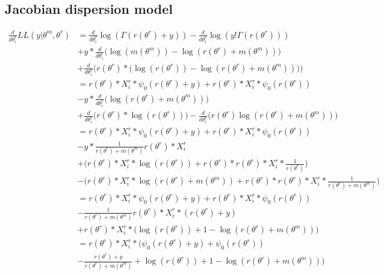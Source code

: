 \documentclass[bibliography=totoc,10pt]{scrartcl}
\begin{document}
\subsection{Jacobian dispersion model}
\begin{equation}
\begin{split}
\frac{d}{d \theta^r_i} LL(y|\theta^m, \theta^r) &= \frac{d}{d \theta^r_i} \log(\Gamma(r(\theta^r)+y)) - \frac{d}{d \theta^r_i} \log(y! \Gamma(r(\theta^r))) \\
&+ y * \frac{d}{d \theta^r_i} \bigg( \log(m(\theta^m)) -\log(r(\theta^r)+m(\theta^m)) \bigg) \\
&+ \frac{d}{d \theta^r_i} \bigg( r(\theta^r) * \bigg( \log(r(\theta^r)) - \log(r(\theta^r)+m(\theta^m)) \bigg) \bigg) \\
&= r(\theta^r) * X^r_{i} * \psi_0(r(\theta^r)+y)+ r(\theta^r) * X^r_{i} * \psi_0(r(\theta^r)) \\
&- y*\frac{d}{d \theta^r_i} \bigg( \log(r(\theta^r)+m(\theta^m)) \bigg) \\
&+ \frac{d}{d \theta^r_i} \bigg( r(\theta^r)*\log(r(\theta^r)) \bigg) - \frac{d}{d \theta^r_i} \bigg( r(\theta^r) \log(r(\theta^r)+m(\theta^m)) \bigg) \\
&= r(\theta^r) * X^r_{i} * \psi_0(r(\theta^r)+y)+ r(\theta^r) * X^r_{i} * \psi_0(r(\theta^r)) \\
&- y*\frac{1}{r(\theta^r)+m(\theta^m)} r(\theta^r) * X^r_{i}   \\
&+  \bigg( r(\theta^r) * X^r_{i}  * \log(r(\theta^r)) + r(\theta^r) * r(\theta^r) * X^r_{i}  * \frac{1}{r(\theta^r)} \bigg) \\
&- \bigg(r(\theta^r) * X^r_{i}  * \log(r(\theta^r)+m(\theta^m)) +  r(\theta^r) * r(\theta^r) * X^r_{i}  * \frac{1}{r(\theta^r)+m(\theta^m)} \bigg) \\
&= r(\theta^r) * X^r_{i} * \psi_0(r(\theta^r)+y)+ r(\theta^r) * X^r_{i} * \psi_0(r(\theta^r)) \\
&- \frac{1}{r(\theta^r)+m(\theta^m)} r(\theta^r) * X^r_{i}  *(r(\theta^r) + y) \\
&+ r(\theta^r) * X^r_{i}  * \bigg( \log(r(\theta^r)) + 1 - \log(r(\theta^r)+m(\theta^m)) \bigg)  \\
&= r(\theta^r) * X^r_{i} * \bigg( \psi_0(r(\theta^r)+y)+\psi_0(r(\theta^r)) \\
&- \frac{r(\theta^r) + y}{r(\theta^r)+m(\theta^m)} + \log(r(\theta^r)) + 1 - \log(r(\theta^r)+m(\theta^m)) \bigg)  \\
\end{split}
\end{equation}
\end{document}
